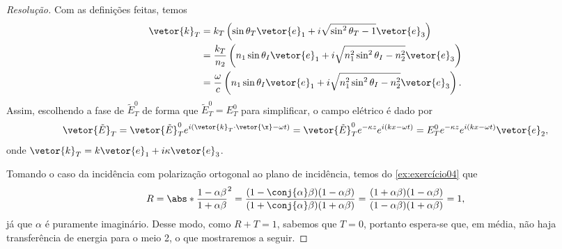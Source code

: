 \begin{proof}[Resolução]
    Com as definições feitas, temos
    \begin{align*}
        \vetor{k}_T &= k_T \left(\sin\theta_T \vetor{e}_1 + i \sqrt{\sin^2\theta_T - 1}\vetor{e}_3\right)\\
                    &= \frac{k_T}{n_2} \left(n_1\sin\theta_I \vetor{e}_1+ i\sqrt{n_1^2 \sin^2 \theta_I - n_2^2}\vetor{e}_3\right)\\
                    &= \frac{\omega}{c}\left(n_1 \sin\theta_I \vetor{e}_1 + i \sqrt{n_1^2 \sin^2 \theta_I - n_2^2}\vetor{e}_3\right).
    \end{align*}
    Assim, escolhendo a fase de \(\tilde{E}_T^0\) de forma que \(\tilde{E}_T^0 = E_T^0\) para simplificar, o campo elétrico é dado por
    \begin{equation*}
        \vetor{\tilde{E}}_T = \vetor{\tilde{E}}_T^0 e^{i(\vetor{k}_T \cdot \vetor{\x} - \omega t)} = \vetor{\tilde{E}}_T^0 e^{-\kappa z} e^{i(k x - \omega t)} = E_T^0 e^{-\kappa z}e^{i(kx - \omega t)}\vetor{e}_2,
    \end{equation*}
    onde \(\vetor{k}_T = k \vetor{e}_1 + i\kappa\vetor{e}_3\).

    Tomando o caso da incidência com polarização ortogonal ao plano de incidência, temos do \cref{ex:exercício04} que
    \begin{equation*}
        R = \abs*{\frac{1 - \alpha \beta}{1 + \alpha \beta}}^2 = \frac{(1 - \conj{\alpha} \beta)(1 - \alpha \beta)}{(1 + \conj{\alpha}\beta)( 1 + \alpha \beta)} = \frac{(1 + \alpha \beta) ( 1 - \alpha \beta)}{(1 - \alpha \beta)( 1 + \alpha \beta)} = 1,
    \end{equation*}
    já que \(\alpha\) é puramente imaginário. Desse modo, como \(R + T = 1\), sabemos que \(T = 0\), portanto espera-se que, em média, não haja transferência de energia para o meio 2, o que mostraremos a seguir.


\end{proof}
